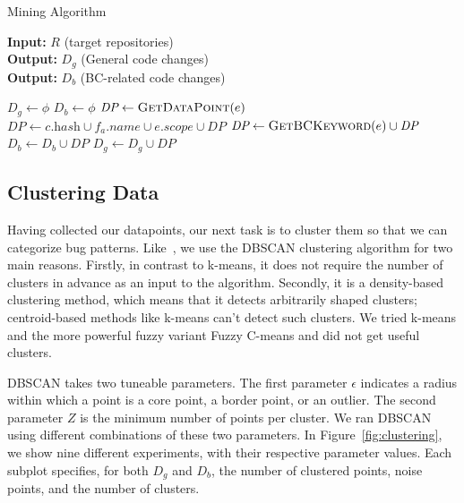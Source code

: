 \begin{algorithm}
\caption{\label{alg} Mining Algorithm}
\hspace*{2mm} \textbf{Input:} $R$ (target repositories)  \\
\hspace*{2mm} \textbf{Output:} $D_g$ (General code changes) \\
\hspace*{2mm} \textbf{Output:} $D_b$ (BC-related code changes)
\begin{algorithmic}
\State $D_g \leftarrow \phi$
\State $D_b \leftarrow \phi$
                    \State $\textit{DP} \leftarrow \textsc{GetDataPoint}(e)$
                    \State $\textit{DP} \leftarrow c.\textit{hash} \cup f_a.\textit{name} \cup e.\textit{scope} \cup \textit{DP} $
                        \State $\textit{DP} \leftarrow \textsc{GetBCKeyword}(e) \cup \textit{DP} $
                        \State $D_b \leftarrow D_b \cup \textit{DP}$
                    \Else
                        \State $D_g \leftarrow D_g \cup \textit{DP}$
                    \EndIf
                \EndFor
            \EndFor
        \EndIf
    \EndFor
\EndFor
\end{algorithmic}
\end{algorithm}

\subsection{\label{sec:clustering_data}Clustering Data}

Having collected our datapoints, our next task is to cluster them so that we can categorize bug patterns. Like~\cite{hanam2016discovering}, we use the DBSCAN clustering algorithm for two main reasons. Firstly, in contrast to k-means, it does not require the number of clusters in advance as an input to the algorithm. Secondly, it is a density-based clustering method, which means that it detects arbitrarily shaped clusters; centroid-based methods like k-means can't detect such clusters. We tried k-means and the more powerful fuzzy variant Fuzzy C-means \cite{dunn1973fuzzy} and did not get useful clusters.

DBSCAN takes two tuneable parameters. The first parameter $\epsilon$ indicates a radius within which a point is a core point, a border point, or an outlier. The second parameter $Z$ is the minimum number of points per cluster. We ran DBSCAN using different combinations of these two parameters. In Figure~\ref{fig:clustering}, we show nine different experiments, with their respective parameter values. Each subplot specifies, for both $D_g$ and $D_b$, the number of clustered points, noise points, and the number of clusters.

